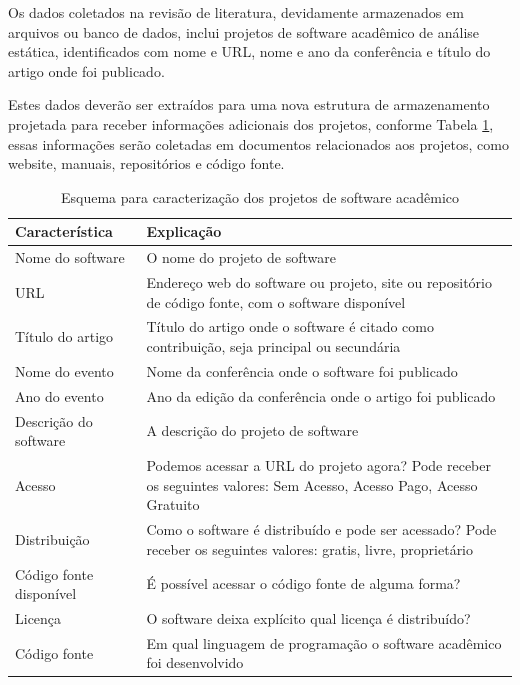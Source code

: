 Os dados coletados na revisão de literatura, devidamente armazenados em
arquivos ou banco de dados, inclui projetos de software acadêmico de análise
estática, identificados com nome e URL, nome e ano da conferência e
título do artigo onde foi publicado.

Estes dados deverão ser extraídos para uma nova estrutura de armazenamento
projetada para receber informações adicionais dos projetos, conforme Tabela
\ref{esquema-caracteristicas}, essas informações serão coletadas em documentos
relacionados aos projetos, como website, manuais, repositórios e código fonte.

\begin{table}[h]
\caption{Esquema para caracterização dos projetos de software acadêmico}
\centering
\begin{tabular}{ l p{11cm} }
  \hline
  Característica           & Explicação \\
  \hline
  Nome do software         & O nome do projeto de software \\
  URL                      & Endereço web do software ou projeto, site ou repositório de código fonte, com o software disponível \\
  Título do artigo         & Título do artigo onde o software é citado como contribuição, seja principal ou secundária \\
  Nome do evento           & Nome da conferência onde o software foi publicado \\
  Ano do evento            & Ano da edição da conferência onde o artigo foi publicado \\
  Descrição do software    & A descrição do projeto de software \\
  Acesso                   & Podemos acessar a URL do projeto agora? Pode receber os seguintes valores: Sem Acesso, Acesso Pago, Acesso Gratuito \\
  Distribuição             & Como o software é distribuído e pode ser acessado? Pode receber os seguintes valores: gratis, livre, proprietário \\
  Código fonte disponível  & É possível acessar o código fonte de alguma forma? \\
  Licença                  & O software deixa explícito qual licença é distribuído? \\
  Código fonte             & Em qual linguagem de programação o software acadêmico foi desenvolvido \\
  \hline
\end{tabular}
\label{esquema-caracteristicas}
\end{table}


